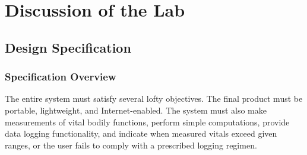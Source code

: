 \documentclass[12pt]{article} %
\begin{document}
\section{Discussion of the Lab}

\subsection{Design Specification\label{sec:designSpec}} 

\subsubsection{Specification Overview}
The entire system must satisfy several lofty objectives. The final product must
be portable, lightweight, and Internet-enabled. The system must also make
measurements of vital bodily functions, perform simple computations, provide
data logging functionality, and indicate when measured vitals exceed given
ranges, or the user fails to comply with a prescribed logging regimen. \\
\end{document}
